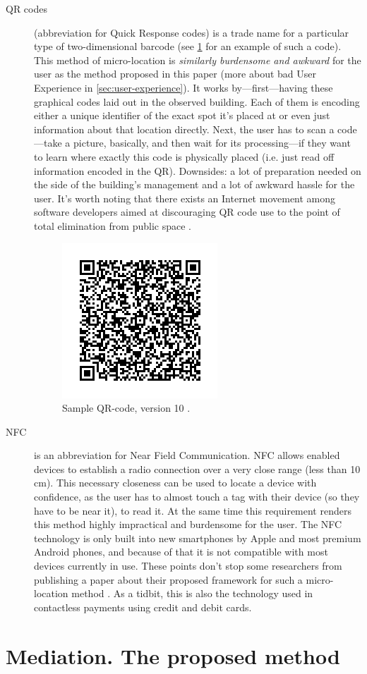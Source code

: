 \begin{description}
	\item[QR codes] (abbreviation for Quick Response codes) is a trade name for a particular type of two-dimensional barcode (see \cref{fig:qr-code} for an example of such a code). This method of micro-location is \emph{similarly burdensome and awkward} for the user as the method proposed in this paper (more about bad User Experience in \cref{sec:user-experience}). It works by---first---having these graphical codes laid out in the observed building. Each of them is encoding either a unique identifier of the exact spot it's placed at or even just information about that location directly. Next, the user has to scan a code---take a picture, basically, and then wait for its processing---if they want to learn where exactly this code is physically placed (i.e. just read off information encoded in the QR). Downsides: a lot of preparation needed on the side of the building's management and a lot of awkward hassle for the user. It's worth noting that there exists an Internet movement among software developers aimed at discouraging QR code use to the point of total elimination from public space \cite{should-i-use-qr}.
	
	\begin{figure}
		\centering
		\includegraphics{qr-code}
		\caption{Sample QR-code, version 10 \cite{wiki:qr-code}.}
		\label{fig:qr-code}
	\end{figure}
	
	\item[NFC] is an abbreviation for Near Field Communication. NFC allows enabled devices to establish a radio connection over a very close range (less than 10 cm). This necessary closeness can be used to locate a device with confidence, as the user has to almost touch a tag with their device (so they have to be near it), to read it. At the same time this requirement renders this method highly impractical and burdensome for the user. The NFC technology is only built into new smartphones by Apple and most premium Android phones, and because of that it is not compatible with most devices currently in use. These points don't stop some researchers from publishing a paper about their proposed framework for such a micro-location method \cite{nfc-ulocation}. As a tidbit, this is also the technology used in contactless payments using credit and debit cards.
	
\end{description}

\section{Mediation. The proposed method}
\label{sec:mediation}

